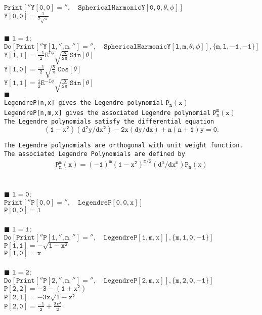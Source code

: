 $\pmb{\mathtt{Print[{''}Y[0,0]={''}, \quad SphericalHarmonicY[0, 0, \theta, \phi ]]}}$\\
$\displaystyle{\mathtt{Y[0,0]=\frac{1}{2\sqrt{\pi}}}}$ \\
\\
\noindent $\blacksquare$ $\mathtt{l=1};$\\
$\pmb{\mathtt{Do[Print[{''}Y[l,'', m, '']={''}, \quad SphericalHarmonicY[l, m, \theta, \phi ]], \{m,l,-1,-1\}]}}$\\[0.3cm]
$\displaystyle{\mathtt{Y[1,1]=\frac{-1}{2}E^{I\phi} \sqrt{\frac{3}{2\pi}}\ Sin[\theta]}}$\\[0.3cm] 
$\displaystyle{\mathtt{Y[1,0]=\frac{-1}{2}\sqrt{\frac{3}{\pi}}\ Cos[\theta]}}$\\[0.3cm]
$\displaystyle{\mathtt{Y[1,1]=\frac{1}{2}E^{-I\phi} \sqrt{\frac{3}{2\pi}}\ Sin[\theta]}}$\\

$\blacksquare$ \textbf{\large{}}\\
\texttt{LegendreP[n,x] gives the Legendre polynomial} $\mathtt{P_n (x)}$\\
\texttt{LegendreP[n,m,x] gives the associated Legendre polynomial} $\mathtt{P_n ^m(x)}$\\

\noindent \texttt{The Legendre polynomials satisfy the differential equation}
\[\mathtt{(1-x^2)(d^2 y/dx^2)-2x(dy/dx)+n(n+1)y=0.} \]

\noindent \texttt{The Legendre polynomials are orthogonal with unit weight function.}\\

\noindent \texttt{The associated Legendre Polynomials are defined by}
\[\mathtt{P_n ^m(x)=(-1)^m (1-x^2)^{m/2}(d^m/dx^m)P_n (x)} \]\\
\\
\noindent $\blacksquare$ $\mathtt{l=0};$\\
$\pmb{\mathtt{Print[{''}P[0,0]={''}, \quad LegendreP[0, 0, x]]}}$\\
$\displaystyle{\mathtt{P[0,0]=1}}$ \\
\\
\noindent $\blacksquare$ $\mathtt{l=1};$\\
$\pmb{\mathtt{Do[Print[{''}P[1,'', m, '']={''}, \quad LegendreP[1, m, x]], \{m,1,0,-1\}]}}$\\[0.3cm]
$\displaystyle{\mathtt{P[1,1]=-\sqrt{1-x^2}}}$\\[0.3cm] 
$\displaystyle{\mathtt{P[1,0]=x}}$ \\
\\
\noindent $\blacksquare$ $\mathtt{l=2};$\\
$\pmb{\mathtt{Do[Print[{''}P[2,'', m, '']={''}, \quad LegendreP[2, m, x]], \{m,2,0,-1\}]}}$\\[0.3cm]
$\displaystyle{\mathtt{P[2,2]=-3-(1+x^2)}}$\\[0.3cm] 
$\displaystyle{\mathtt{P[2,1]=-3x\sqrt{1-x^2}}}$\\[0.3cm]
$\displaystyle{\mathtt{P[2,0]=\frac{-1}{2}+\frac{3x^2}{2}}}$

